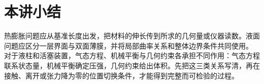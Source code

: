 \section{本讲小结}
热膨胀问题应从基准长度出发，把材料的伸长传到所求的几何量或仪器读数。液面问题应区分一层界面与双面薄膜，并将局部曲率关系和整体边界条件共同使用。
对于液柱和活塞装置，气态方程、机械平衡与几何约束各承担不同作用：气态方程联系状态量，机械平衡确定压强，几何约束给出体积。先把这三类关系写清，再在接触、离开或张力降为零的位置切换条件，才能得到完整而可检验的过程。
